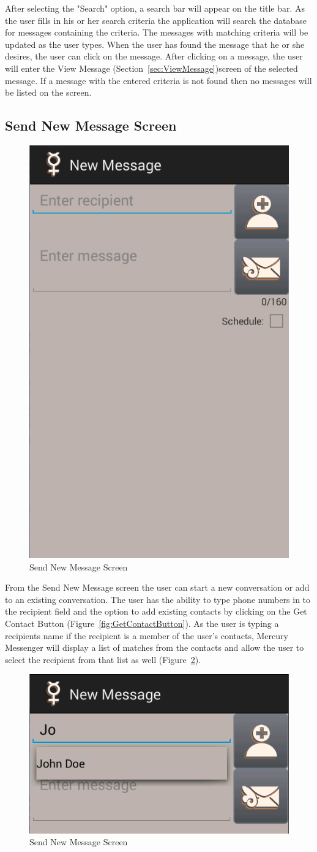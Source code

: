 \documentclass{article}
\begin{document}
After selecting the "Search" option, a search bar will appear on the title bar. 
As the user fills in his or her search criteria the application will search the database for messages containing the criteria.
The messages with matching criteria will be updated as the user types.
When the user has found the message that he or she desires, the user can click on the message. After clicking on a message, the user will enter the View Message (Section~\autoref{sec:ViewMessage})screen of the selected message.
If a message with the entered criteria is not found then no messages will be listed on the screen.


\subsection{Send New Message Screen}
\label{sec:NewMessage}
\begin{figure}[ht!]
\centering
\includegraphics[width=.25\textwidth]{"./Screen_shots/Send_Message_Screen2"}{}
\caption{Send New Message Screen}
\label{fig:NewMessage}
\end{figure}

\par From the Send New Message screen the user can start a new conversation or add to an existing conversation. The user has the ability to type phone numbers in to the recipient field and the option to add existing contacts by clicking on the Get Contact Button (Figure~\ref{fig:GetContactButton}). 
As the user is typing a recipients name if the recipient is a member of the user's contacts, Mercury Messenger will display a list of matches from the contacts and allow the user to select the recipient from that list as well (Figure~\ref{fig:NewMessageAutoFill}).

\begin{figure}[h!]
\centering
\includegraphics[width=.25\textwidth]{"./Screen_shots/Auto_Fill_Send_Msg"}{}
\caption{Send New Message Screen}
\label{fig:NewMessageAutoFill}
\end{figure}
\end{document}
